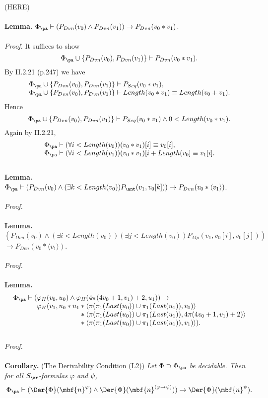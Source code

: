 (HERE)\\
\ \\
\textbf{Lemma.} $\Phi_\pa \vdash (P_{Dvn} (v_0) \land P_{Dvn} (v_1)) \rightarrow P_{Dvn} (v_0 \ast v_1)$.\\
\ \\
\textit{Proof.} It suffices to show
\[
\Phi_\pa \cup \{ P_{Dvn} (v_0), P_{Dvn} (v_1) \} \vdash P_{Dvn} (v_0 \ast v_1).
\]
By II.2.21 (p.247) we have
\[
\begin{array}{l}
\Phi_\pa \cup \{ P_{Dvn} (v_0), P_{Dvn} (v_1) \} \vdash P_{Seq} (v_0 \ast v_1),\cr
\Phi_\pa \cup \{ P_{Dvn} (v_0), P_{Dvn} (v_1) \} \vdash Length(v_0 \ast v_1) \equiv Length(v_0 + v_1).
\end{array}
\]
Hence
\[
\Phi_\pa \cup \{ P_{Dvn} (v_0), P_{Dvn} (v_1) \} \vdash P_{Seq} (v_0 \ast v_1) \land 0 < Length(v_0 \ast v_1).
\]
Again by II.2.21,
\[
\begin{array}{l}
\Phi_\pa \vdash (\forall i < Length(v_0))(v_0 \ast v_1)[i] \equiv v_0[i],\cr
\Phi_\pa \vdash (\forall i < Length(v_1))(v_0 \ast v_1)[i + Length(v_0] \equiv v_1[i].
\end{array}
\]
\ \\
\textbf{Lemma.} $\Phi_\pa \vdash (P_{Dvn} (v_0) \land (\exists k < Length(v_0)) P_\ant (v_1, v_0[k])) \rightarrow P_{Dvn} (v_0 \ast \langle v_1 \rangle)$.\\
\ \\
\textit{Proof.}\\
\ \\
\textbf{Lemma.} $(P_{Dvn} (v_0) \land (\exists i < Length(v_0))(\exists j < Length(v_0))P_{Mp} (v_1, v_0[i], v_0[j]))$ $\rightarrow P_{Dvn} (v_0 \ast \langle v_1 \rangle)$.\\
\ \\
\textit{Proof.}\\
\ \\
\textbf{Lemma.} 
\[
\begin{array}{l}
\Phi_\pa \vdash (\varphi_H (v_0, u_0) \land \varphi_H (4\pi (4v_0 + 1, v_1) + 2, u_1)) \rightarrow\cr
\phantom{\Phi_\pa \vdash (} \varphi_H (v_1, u_0 \ast u_1 \ast \langle \pi (\pi_1 (Last(u_0)) \cup \pi_1 (Last(u_1)), v_0) \rangle\cr
\phantom{\Phi_\pa \vdash (\varphi_H (v_1, u_0 \ast u_1} \ast \langle \pi (\pi_1 (Last(u_0)) \cup \pi_1 (Last(u_1)), 4\pi (4v_0 + 1, v_1) + 2) \rangle\cr
\phantom{\Phi_\pa \vdash (\varphi_H (v_1, u_0 \ast u_1} \ast \langle \pi (\pi_1 (Last(u_0)) \cup \pi_1 (Last(u_1)), v_1) \rangle
).
\end{array}
\]
\ \\
\textit{Proof.}\\
\ \\
\textbf{Corollary.} (The Derivability Condition (L2)) \emph{Let $\Phi \supset \Phi_\pa$ be decidable. Then for all $S_\ar$-formulas $\varphi$ and $\psi$,
\[
\Phi_\pa \vdash (\Der{\Phi} (\mbf{n}^\varphi ) \land \Der{\Phi} (\mbf{n}^{(\varphi \rightarrow \psi )})) \rightarrow \Der{\Phi} (\mbf{n}^\psi ).
\]}